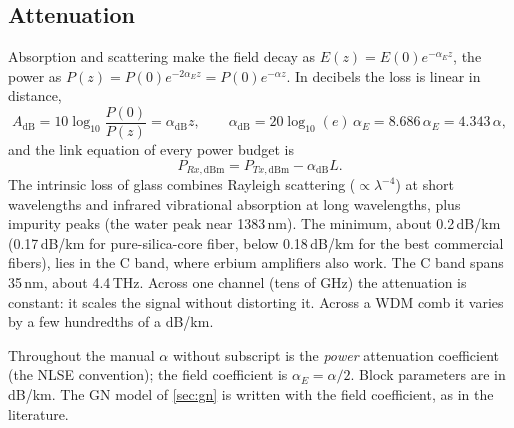 \subsection{Attenuation}
Absorption and scattering make the field decay as $E(z)=E(0)e^{-\alpha_Ez}$, the power as
$P(z)=P(0)e^{-2\alpha_Ez}=P(0)e^{-\alpha z}$. In decibels the loss is linear in distance,
\begin{equation}
  A_{\mathrm{dB}}=10\log_{10}\frac{P(0)}{P(z)}=\alpha_{\mathrm{dB}}z,\qquad
  \alpha_{\mathrm{dB}}=20\log_{10}(e)\,\alpha_E=8.686\,\alpha_E=4.343\,\alpha,
\end{equation}
and the link equation of every power budget is
\begin{equation}
  P_{Rx,\mathrm{dBm}}=P_{Tx,\mathrm{dBm}}-\alpha_{\mathrm{dB}}L .
\end{equation}
The intrinsic loss of glass combines Rayleigh scattering ($\propto\lambda^{-4}$) at short
wavelengths and infrared vibrational absorption at long wavelengths, plus impurity peaks (the
water peak near 1383\,nm). The minimum, about 0.2\,dB/km (0.17\,dB/km for pure-silica-core fiber,
below 0.18\,dB/km for the best commercial fibers), lies in the C band, where erbium amplifiers
also work. The C band spans 35\,nm, about 4.4\,THz. Across one channel (tens of GHz) the
attenuation is constant: it scales the signal without distorting it. Across a WDM comb it
varies by a few hundredths of a dB/km.

\begin{keypoint}
Throughout the manual $\alpha$ without subscript is the \emph{power} attenuation coefficient
(the NLSE convention); the field coefficient is $\alpha_E=\alpha/2$. Block parameters are in
dB/km. The GN model of \cref{sec:gn} is written with the field coefficient, as in the
literature.
\end{keypoint}

